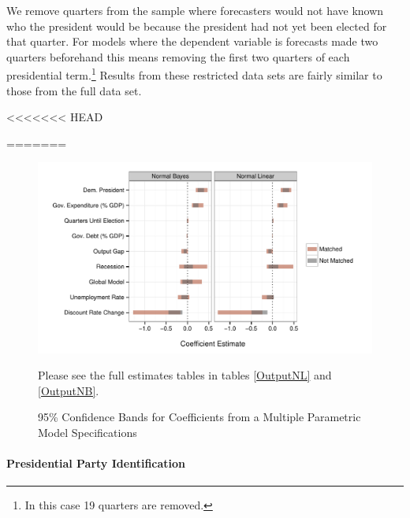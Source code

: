\documentclass[a4paper]{article}
\newenvironment{knitrout}{}{} %
\begin{document}
We remove quarters from the sample where forecasters would not have known who the president would be because the president had not yet been elected for that quarter. For models where the dependent variable is forecasts made two quarters beforehand this means removing the first two quarters of each presidential term.\footnote{In this case 19 quarters are removed.} Results from these restricted data sets are fairly similar to those from the full data set.




<<<<<<< HEAD






=======
\begin{figure}[t]
    \caption{95\% Confidence Bands for Coefficients from a Multiple Parametric Model Specifications}
    \label{CoefComparePlots}
    \begin{center}

\begin{knitrout}
\color{fgcolor}

{\centering \includegraphics[width=0.95\linewidth]{figure/CoefComparePlots} 

}



\end{knitrout}

    \end{center}
    \begin{singlespace}
        {\scriptsize{Please see the full estimates tables in tables \ref{OutputNL} and \ref{OutputNB}.}}
    \end{singlespace}
\end{figure}

\paragraph{Presidential Party Identification}
\end{document}

